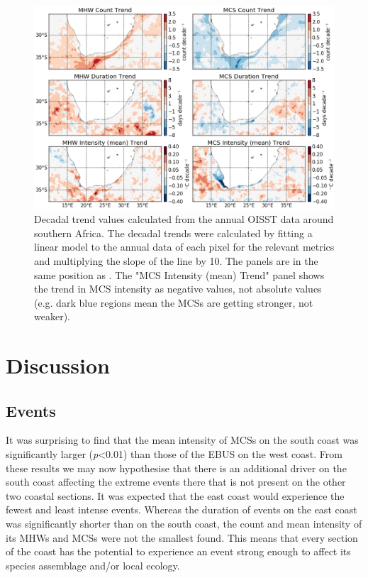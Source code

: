 \documentclass[a4paper,10pt,review]{elsarticle}
\begin{document}
\begin{figure}
\centering \includegraphics[width=1.0\textwidth]{MHW_MCS_trend.png}
\caption{Decadal trend values calculated from the annual OISST data around southern Africa. The decadal trends were calculated by fitting a linear model to the annual data of each pixel for the relevant metrics and multiplying the slope of the line by 10. The panels are in the same position as . The "MCS Intensity (mean) Trend" panel shows the trend in MCS intensity as negative values, not absolute values (e.g. dark blue regions mean the MCSs are getting stronger, not weaker).}
\label{fig:Figure7}
\end{figure}

\section{Discussion}

\subsection{Events}
It was surprising to find that the mean intensity of MCSs on the south coast was significantly larger (\emph{p}<0.01) than those of the EBUS on the west coast. From these results we may now hypothesise that there is an additional driver on the south coast affecting the extreme events there that is not present on the other two coastal sections. It was expected that the east coast would experience the fewest and least intense events. Whereas the duration of events on the east coast was significantly shorter than on the south coast, the count and mean intensity of its MHWs and MCSs were not the smallest found. This means that every section of the coast has the potential to experience an event strong enough to affect its species assemblage and/or local ecology.
\end{document}
